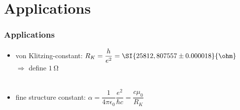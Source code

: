 \section{Applications}
\begin{frame}
\frametitle{Applications}
\begin{itemize}
	\item von Klitzing-constant: \quad $R_K = \dfrac{h}{e^2} = \SI{25812,807557 \pm 0.000018}{\ohm}$\\ $\Rightarrow$ define $\SI{1}{\ohm}$\\\ \\
	
	\item fine structure constant: \quad $\alpha = \dfrac{1}{4\pi \epsilon_0}\dfrac{e^2}{\hbar c} = \dfrac{c\mu_0}{R_K}$
\end{itemize}
	
\end{frame}